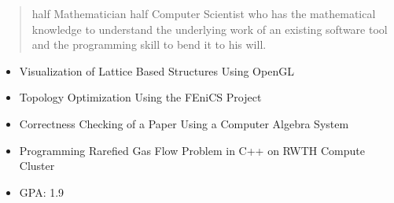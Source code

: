 \documentclass[10pt,a4paper,ragged2e,withhyper]{altacv}
\begin{document}
\begin{paracol}{2}
        \newpage
        
        \switchcolumn
        
            \begin{quote}
                half Mathematician half Computer Scientist who has the mathematical knowledge to understand the underlying 
                work of an existing software tool and the programming skill to bend it to his will.
            \end{quote}
        
            \begin{itemize}
                \item Visualization of Lattice Based Structures Using OpenGL
                \item Topology Optimization Using the FEniCS Project 
                \item Correctness Checking of a Paper Using a Computer Algebra System
            \end{itemize}
            \begin{itemize}
                \item Programming Rarefied Gas Flow Problem in C++ on RWTH Compute Cluster
            \end{itemize}
        
            \begin{itemize}
                \item GPA: 1.9
            \end{itemize}
            

\end{paracol}
\end{document}
